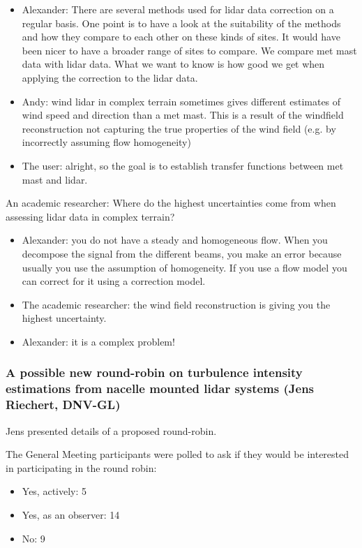 \begin{itemize}
\item Alexander: There are several methods used for lidar data correction on   a regular basis. One point is to have a look at the suitability of the  methods and how they compare to each other on these kinds of sites. It would have been nicer to have a broader range of sites to compare. We compare met mast data with lidar data. What we want to know is how good we get when applying the correction to the lidar data. 
\item Andy: wind lidar in complex terrain sometimes gives different estimates of wind speed and direction than a met mast. This is a result of the windfield reconstruction not capturing the true properties of the wind field (e.g. by incorrectly assuming flow homogeneity)
\item The user: alright, so the goal is to establish transfer functions between met mast and lidar.
\end{itemize}

An academic researcher: Where do the highest uncertainties come from when assessing lidar data in complex terrain?

\begin{itemize}
\item Alexander: you do not have a steady and homogeneous flow. When you decompose the signal from the different beams, you make an error because usually you use the assumption of homogeneity. If you use a flow model you can correct for it using a correction model.
\item The academic researcher: the wind field reconstruction is giving you the highest uncertainty.
\item Alexander: it is a complex problem!
\end{itemize}

\subsubsection[A possible round robin on turbulence estimates from nacelle-mounted lidar]{A possible new round-robin on turbulence intensity estimations from nacelle mounted lidar systems (Jens Riechert, DNV-GL)}

Jens presented details of a proposed round-robin.

The General Meeting participants were polled to ask if they would be interested in participating in the round robin:

\begin{itemize}
\item Yes, actively: 5
\item Yes, as an observer: 14
\item No: 9
\end{itemize}

